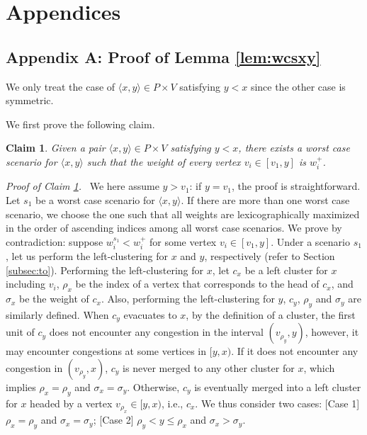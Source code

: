 \documentclass[a4paper]{llncs}
\newtheorem{clm}{Claim}
\begin{document}
\clearpage

\section*{Appendices}

\subsection*{Appendix A: Proof of Lemma \ref{lem:wcsxy}}
\label{app:a}

We only treat the case of $\langle x, y \rangle \in P \times V$ satisfying $y < x$ since the other case is symmetric.

We first prove the following claim.
\begin{clm}
Given a pair $\langle x, y \rangle \in P \times V$ satisfying $y < x$,
there exists a worst case scenario for $\langle x, y \rangle$ such that 
the weight of every vertex $v_i \in [v_1, y]$ is $w^+_i$.
\label{clm:2}
\end{clm}

\noindent
{\it Proof of Claim \ref{clm:2}.} \
We here assume $y > v_1$: if $y = v_1$, the proof is straightforward.
Let $s_1$ be a worst case scenario for $\langle x, y \rangle$.
If there are more than one worst case scenario, 
we choose the one such that all weights are lexicographically maximized in the order of ascending indices
among all worst case scenarios.
We prove by contradiction: suppose $w^{s_1}_i < w^+_i$ for some vertex $v_i \in [v_1, y]$. 
Under a scenario $s_1$, let us perform the left-clustering for $x$ and $y$, respectively (refer to Section \ref{subsec:to}).
Performing the left-clustering for $x$,
let $c_x$ be a left cluster for $x$ including $v_i$, 
$\rho_x$ be the index of a vertex that corresponds to the head of $c_x$,
and $\sigma_x$ be the weight of $c_x$.
Also, performing the left-clustering for $y$, $c_y$, $\rho_y$ and $\sigma_y$ are similarly defined. 
When $c_y$ evacuates to $x$, 
by the definition of a cluster, the first unit of $c_y$ does not encounter any congestion in the interval $(v_{\rho_y}, y)$,
however, it may encounter congestions at some vertices in $[y, x)$.
If it does not encounter any congestion in $(v_{\rho_y}, x)$, 
$c_y$ is never merged to any other cluster for $x$,
which implies $\rho_x =\rho_y$ and $\sigma_x = \sigma_y$.
Otherwise, $c_y$ is eventually merged into a left cluster for $x$ headed by a vertex $v_{\rho_x} \in [y, x)$, i.e., $c_x$.
We thus consider two cases: 
[Case 1] $\rho_x = \rho_y$ and $\sigma_x = \sigma_y$; 
[Case 2] $\rho_y < y \le \rho_x$ and $\sigma_x > \sigma_y$.
\end{document}
